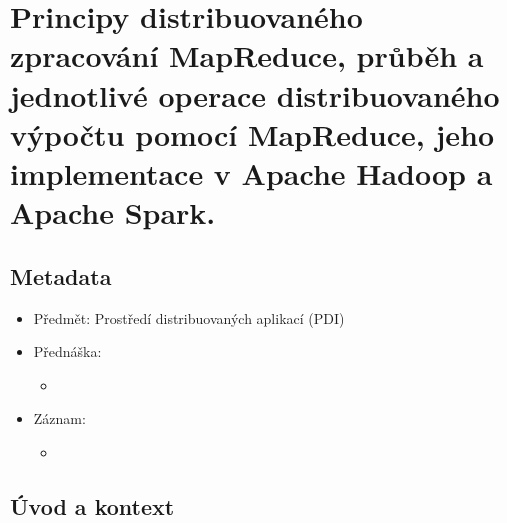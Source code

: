 

\chapter{Principy distribuovaného zpracování MapReduce, průběh a jednotlivé operace distribuovaného výpočtu pomocí MapReduce, jeho implementace v Apache Hadoop a Apache Spark.}


\section{Metadata}

\begin{itemize}
    \item Předmět: Prostředí distribuovaných aplikací (PDI)
    \item Přednáška:
    \begin{itemize}
        \item {}
    \end{itemize}
    \item Záznam:
    \begin{itemize}
        \item {}
    \end{itemize}
\end{itemize}


\section{Úvod a kontext}

